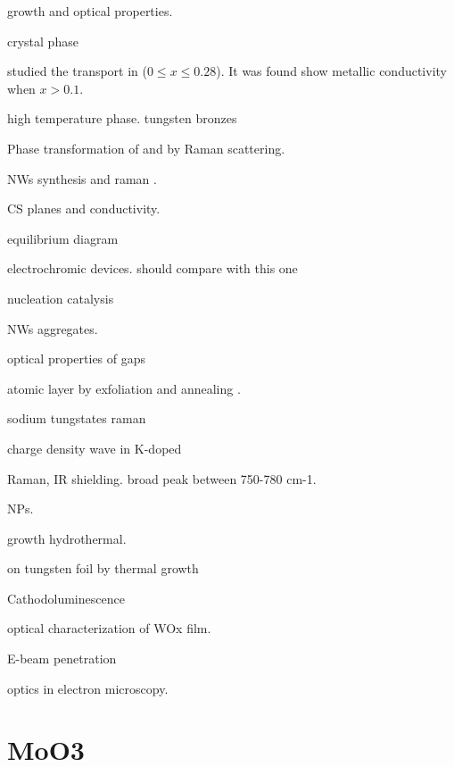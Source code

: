  growth and optical properties. \cite{Oishi2001} \cite{Itoh2001}

 crystal phase \cite{Viswanathan1974}

\citeauthor{Salje1984} studied the transport in  ($0\leq x \leq 0.28$).\cite{Salje1984} It was found  show metallic conductivity when $x > 0.1$.

 \cite{Migas2010}

 high temperature phase. \cite{Vogt1999}
tungsten bronzes \cite{Wiseman1976}

Phase transformation of  and  by Raman scattering. \cite{Lima2011}

 NWs synthesis and raman \cite{Ma2005}.

 CS planes and conductivity.\cite{Sahle1983}

 equilibrium diagram \cite{Wriedt1989}

 electrochromic devices.\cite{Liu2013d} should compare with this one \cite{Wang2008}

nucleation catalysis \cite{Turnbull1952}

 NWs aggregates. \cite{Kozan2008a}

optical properties of  gaps\cite{Saygin-Hinczewski2008}

 atomic layer by exfoliation and annealing . \cite{Kalantar-zadeh2010a}

sodium tungstates raman \cite{Redkin2010}

charge density wave in K-doped  \cite{Raj2008}

 Raman, IR shielding.\cite{Guo2012} \cite{Guo2011}
broad peak between 750-780 cm-1.

 NPs. \cite{Frey2001}

 growth hydrothermal.\cite{Moshofsky2012}

 on tungsten foil by thermal growth\cite{VanHieu2012}

Cathodoluminescence \cite{Parish2007}

optical characterization of WOx film.\cite{Valyukh2010a}

E-beam penetration \cite{Kanaya2002}

optics in electron microscopy. \cite{GarciadeAbajo2010a}


\section{MoO3}

